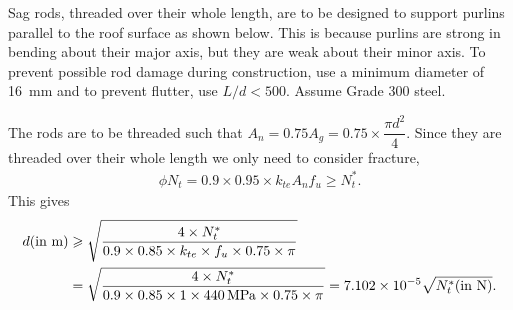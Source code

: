 \begin{exmp}
Sag rods, threaded over their whole length, are to be designed to support purlins parallel to the roof surface as shown below.
This is because purlins are strong in bending about their major axis, but they are weak about their minor axis.
To prevent possible rod damage during construction, use a minimum diameter of \SI{16}{\mm} and to prevent flutter, use $L/d<500$.
Assume Grade 300 steel.
\begin{figure}[H]
\centering

\end{figure}
\end{exmp}
\begin{solution}
The rods are to be threaded such that $A_n=0.75A_g=0.75\times\dfrac{\pi{}d^2}{4}$.
Since they are threaded over their whole length we only need to consider fracture,
\begin{gather*}
\phi{}N_t=0.9\times0.95\times{}k_{te}A_nf_u\geqslant{}N^*_t.
\end{gather*}
This gives
\begin{gather*}
\begin{split}
d(\text{in~}\si{\meter})&\geqslant\sqrt{\dfrac{4\times{}N^*_t}{0.9\times0.85\times{}k_{te}\times{}f_u\times0.75\times\pi{}}}\\&=\sqrt{\dfrac{4\times{}N^*_t}{0.9\times0.85\times{}1\times{}\SI{440}{\mega\pascal}\times0.75\times\pi{}}}=\num{7.102e-5}\sqrt{N^*_t(\text{in~}\si{\newton})}.
\end{split}
\end{gather*}


\end{solution}
